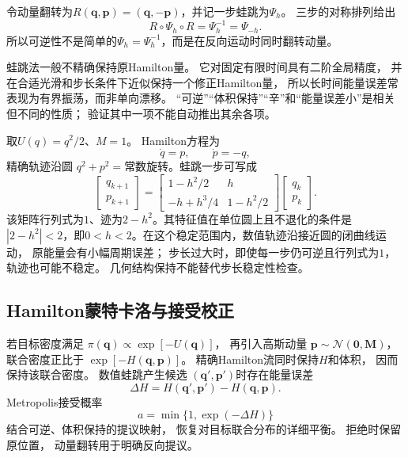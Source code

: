 令动量翻转为$R(\bm{q},\bm{p})=(\bm{q},-\bm{p})$，并记一步蛙跳为$\Psi_h$。
三步的对称排列给出
\[
	R\circ\Psi_h\circ R=\Psi_h^{-1}=\Psi_{-h}.
\]
所以可逆性不是简单的$\Psi_h=\Psi_h^{-1}$，而是在反向运动时同时翻转动量。

蛙跳法一般不精确保持原Hamilton量。 它对固定有限时间具有二阶全局精度，
并在合适光滑和步长条件下近似保持一个修正Hamilton量，
所以长时间能量误差常表现为有界振荡，而非单向漂移。
“可逆”“体积保持”“辛”和“能量误差小”是相关但不同的性质；
验证其中一项不能自动推出其余各项。

\begin{example}[谐振子的精确与数值轨道]
	\label{ex:dynamical-harmonic-oscillator} 取$U(q)=q^{2}/2$、$M=1$。 Hamilton方程为
	\[
		\dot q=p,\qquad \dot p=-q,
	\]
	精确轨迹沿圆 $q^{2}+p^{2}=\text{常数}$旋转。蛙跳一步可写成
	\[
		\begin{bmatrix}q_{k+1}\\p_{k+1}\end{bmatrix}
		=
		\begin{bmatrix}
			1-h^2/2 & h\\
			-h+h^3/4 & 1-h^2/2
		\end{bmatrix}
		\begin{bmatrix}q_k\\p_k\end{bmatrix}.
	\]
	该矩阵行列式为$1$、迹为$2-h^2$。其特征值在单位圆上且不退化的条件是
	$|2-h^2|<2$，即$0<h<2$。在这个稳定范围内，数值轨迹沿接近圆的闭曲线运动，
	原能量会有小幅周期误差； 步长过大时，即使每一步仍可逆且行列式为$1$，
	轨迹也可能不稳定。 几何结构保持不能替代步长稳定性检查。
\end{example}

\subsection{Hamilton蒙特卡洛与接受校正}

若目标密度满足 $\pi(\bm{q})\propto\exp[-U(\bm{q})]$， 再引入高斯动量
$\bm{p}\sim \mathcal{N}(\bm{0},\bm{M})$， 联合密度正比于 $\exp[-H(\bm{q},\bm{p})]$。
精确Hamilton流同时保持$H$和体积， 因而保持该联合密度。 数值蛙跳产生候选
$(\bm{q}',\bm{p}')$时存在能量误差
\[
	\Delta H = H(\bm{q}',\bm{p}')-H(\bm{q},\bm{p}).
\]
Metropolis接受概率
\begin{equation}
	a = \min\{1,\exp(-\Delta H)\} \label{eq:dynamical-hmc-acceptance}
\end{equation}
结合可逆、体积保持的提议映射， 恢复对目标联合分布的详细平衡。 拒绝时保留原位置， 动量翻转用于明确反向提议。

